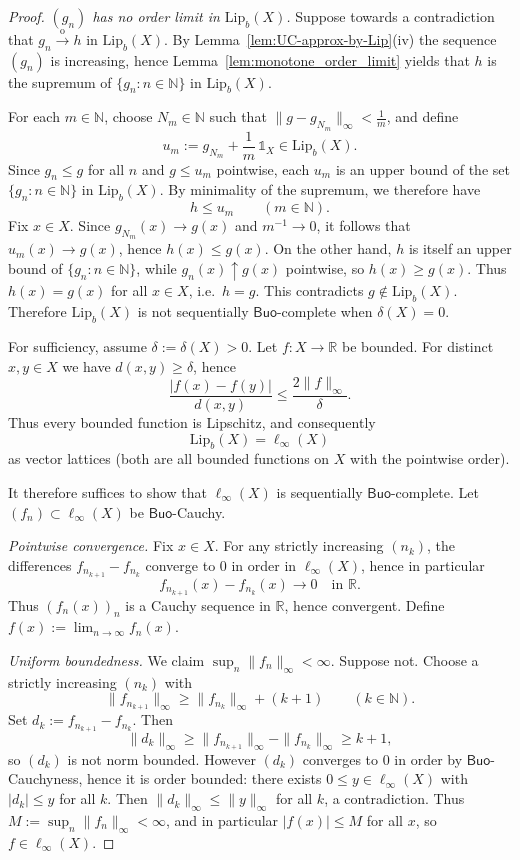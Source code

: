 \documentclass[11pt]{amsart}
\theoremstyle{definition}
\newcommand{\R}{\mathbb{R}}
\newcommand{\N}{\mathbb{N}}
\newcommand{\Buo}{\ensuremath{\mathsf{Buo}}}
\renewcommand{\le}{\leqslant}
\renewcommand{\ge}{\geqslant}
\begin{document}
\begin{proof}
\smallskip\noindent
\emph{$(g_n)$ has no order limit in $\mathrm{Lip}_b(X)$.}
Suppose towards a contradiction that $g_n\xrightarrow{\mathrm{o}}h$ in
$\mathrm{Lip}_b(X)$. By Lemma~\ref{lem:UC-approx-by-Lip}\textup{(iv)} the
sequence $(g_n)$ is increasing, hence Lemma~\ref{lem:monotone_order_limit}
yields that $h$ is the supremum of $\{g_n:n\in\N\}$ in
$\mathrm{Lip}_b(X)$.

For each $m\in\N$, choose $N_m\in\N$ such that
$\|g-g_{N_m}\|_\infty<\tfrac1m$, and define
\[
u_m:=g_{N_m}+\frac1m\,\mathds{1}_X\in \mathrm{Lip}_b(X).
\]
Since $g_n\le g$ for all $n$ and $g\le u_m$ pointwise, each $u_m$ is an
upper bound of the set $\{g_n:n\in\N\}$ in $\mathrm{Lip}_b(X)$. By minimality
of the supremum, we therefore have
\[
h\le u_m\qquad(m\in\N).
\]
Fix $x\in X$. Since $g_{N_m}(x)\to g(x)$ and $m^{-1}\to 0$, it follows that
$u_m(x)\to g(x)$, hence $h(x)\le g(x)$. On the other hand, $h$ is itself an
upper bound of $\{g_n:n\in\N\}$, while $g_n(x)\uparrow g(x)$ pointwise, so
$h(x)\ge g(x)$. Thus $h(x)=g(x)$ for all $x\in X$, i.e.\ $h=g$.
This contradicts $g\notin \mathrm{Lip}_b(X)$.
Therefore $\mathrm{Lip}_b(X)$ is not sequentially \Buo-complete when
$\delta(X)=0$.

\medskip
\noindent For sufficiency, assume $\delta:=\delta(X)>0$.
Let $f:X\to\R$ be bounded. For distinct $x,y\in X$ we have $d(x,y)\ge\delta$, hence
\[
\frac{|f(x)-f(y)|}{d(x,y)}\le \frac{2\|f\|_\infty}{\delta}.
\]
Thus every bounded function is Lipschitz, and consequently
\[
\mathrm{Lip}_b(X)=\ell_\infty(X)
\]
as vector lattices (both are all bounded functions on $X$ with the pointwise order).

It therefore suffices to show that $\ell_\infty(X)$ is sequentially \Buo-complete.
Let $(f_n)\subset\ell_\infty(X)$ be \Buo-Cauchy.

\smallskip\noindent
\emph{Pointwise convergence.}
Fix $x\in X$. For any strictly increasing $(n_k)$, the differences
$f_{n_{k+1}}-f_{n_k}$ converge to $0$ in order in $\ell_\infty(X)$, hence in particular
\[
f_{n_{k+1}}(x)-f_{n_k}(x)\to0\quad\text{in }\R.
\]
Thus $(f_n(x))_n$ is a Cauchy sequence in $\R$, hence convergent.
Define $f(x):=\lim_{n\to\infty}f_n(x)$.

\smallskip\noindent
\emph{Uniform boundedness.}
We claim $\sup_n\|f_n\|_\infty<\infty$.
Suppose not. Choose a strictly increasing $(n_k)$ with
\[
\|f_{n_{k+1}}\|_\infty\ge \|f_{n_k}\|_\infty+(k+1)\qquad(k\in\N).
\]
Set $d_k:=f_{n_{k+1}}-f_{n_k}$. Then
\[
\|d_k\|_\infty\ge \|f_{n_{k+1}}\|_\infty-\|f_{n_k}\|_\infty\ge k+1,
\]
so $(d_k)$ is not norm bounded.
However $(d_k)$ converges to $0$ in order by \Buo-Cauchyness, hence it is order bounded:
there exists $0\le y\in\ell_\infty(X)$ with $|d_k|\le y$ for all $k$.
Then $\|d_k\|_\infty\le\|y\|_\infty$ for all $k$, a contradiction.
Thus $M:=\sup_n\|f_n\|_\infty<\infty$, and in particular $|f(x)|\le M$ for all $x$, so $f\in\ell_\infty(X)$.


\end{proof}
\end{document}
